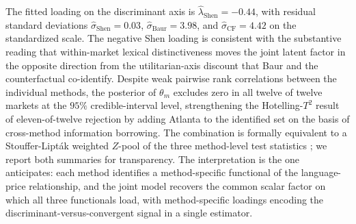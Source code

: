 The fitted loading on the discriminant axis is
$\widehat{\lambda}_{\mathrm{Shen}} = -0.44$, with residual standard
deviations $\widehat{\sigma}_{\mathrm{Shen}} = 0.03$,
$\widehat{\sigma}_{\mathrm{Baur}} = 3.98$, and
$\widehat{\sigma}_{\mathrm{CF}} = 4.42$ on the standardized scale.
The negative Shen loading is consistent with the substantive reading
that within-market lexical distinctiveness moves the joint latent
factor in the opposite direction from the utilitarian-axis discount
that Baur and the counterfactual co-identify.  Despite weak pairwise
rank correlations between the individual methods, the posterior of
$\theta_m$ excludes zero in all twelve of twelve markets at the
$95\%$ credible-interval level, strengthening the Hotelling-$T^2$
result of eleven-of-twelve rejection by adding Atlanta to the
identified set on the basis of cross-method information borrowing.
The combination is formally equivalent to a Stouffer-Lipt\'ak
weighted $Z$-pool of the three method-level test statistics
\citep{liptak1958combination}; we report both summaries for
transparency.  The interpretation is the one
\citet{heckman2008econometric} anticipates: each method identifies a
method-specific functional of the language-price relationship, and
the joint model recovers the common scalar factor on which all three
functionals load, with method-specific loadings encoding the
discriminant-versus-convergent signal in a single estimator.
